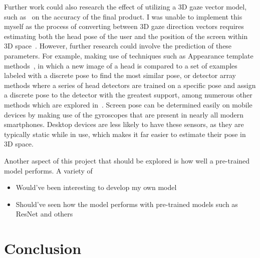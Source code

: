 \documentclass[twocolumn]{report}
\begin{document}
Further work could also research the effect of utilizing a 3D gaze vector model, such as~\cite{zaho2024gazeswin,yu2019deep} on the accuracy of the final product. I was unable to implement this myself as the process of converting between 3D gaze direction vectors requires estimating both the head pose of the user and the position of the screen within 3D space~\cite{zhang15cvpr}. However, further research could involve the prediction of these parameters. For example, making use of techniques such as Appearance template methods~\cite{niyogi1996example}, in which a new image of a head is compared to a set of examples labeled with a discrete pose to find the most similar pose, or detector array methods where a series of head detectors are trained on a specific pose and assign a discrete pose to the detector with the greatest support, among numerous other methods which are explored in~\cite{chutorian2009head}. Screen pose can be determined easily on mobile devices by making use of the gyroscopes that are present in nearly all modern smartphones. Desktop devices are less likely to have these sensors, as they are typically static while in use, which makes it far easier to estimate their pose in 3D space.

Another aspect of this project that should be explored is how well a pre-trained model performs. A variety of 


\begin{itemize}
    \item Would've been interesting to develop my own model
    \item Should've seen how the model performs with pre-trained models such as ResNet and others
\end{itemize}

\chapter{Conclusion}

\printbibliography
\end{document}
